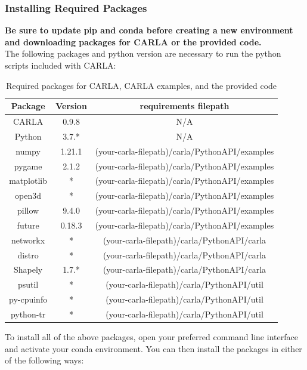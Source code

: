 \documentclass[12pt,oneside,letterpaper]{article}
\begin{document}
\subsubsection{Installing Required Packages}
\label{subsec:Requirements}
\textbf{Be sure to update pip and conda before creating a new environment and downloading packages for CARLA or the provided code.} \\
The following packages and python version are necessary to run the python scripts included with CARLA:
\begin{table}[h]
\centering
 \begin{tabular}{| c | c | c |}
 \hline
 Package & Version & requirements filepath \\
 \hline 
CARLA & 0.9.8 & N/A \\
 Python & 3.7.* & N/A \\
 numpy & 1.21.1 & (your-carla-filepath)/carla/PythonAPI/examples \\
 pygame & 2.1.2 & (your-carla-filepath)/carla/PythonAPI/examples \\
 matplotlib & * & (your-carla-filepath)/carla/PythonAPI/examples \\
 open3d & * & (your-carla-filepath)/carla/PythonAPI/examples \\
 pillow & 9.4.0 & (your-carla-filepath)/carla/PythonAPI/examples \\
 future & 0.18.3 & (your-carla-filepath)/carla/PythonAPI/examples \\
 networkx & * & (your-carla-filepath)/carla/PythonAPI/carla \\
 distro & * & (your-carla-filepath)/carla/PythonAPI/carla \\
 Shapely & 1.7.* & (your-carla-filepath)/carla/PythonAPI/carla \\
 psutil & * &  (your-carla-filepath)/carla/PythonAPI/util \\
 py-cpuinfo & * & (your-carla-filepath)/carla/PythonAPI/util \\
 python-tr & * & (your-carla-filepath)/carla/PythonAPI/util \\

 \hline
 \end{tabular}
\caption{Required packages for CARLA, CARLA examples, and the provided code}
\label{table:RequirementsTable}
\end{table}

To install all of the above packages, open your preferred command line interface and activate your conda environment. You can then install the packages in either of the following ways:
\end{document}
